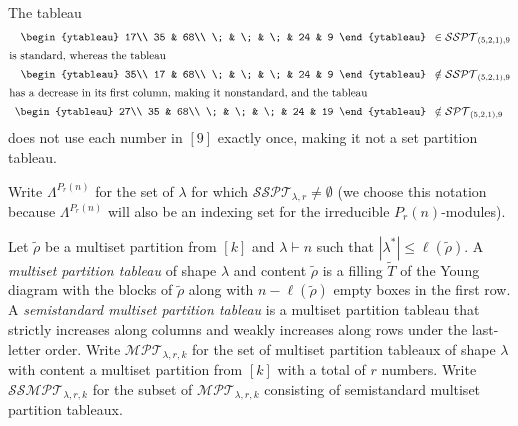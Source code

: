 \documentclass[ALCO,Unicode,published]{cedram}
\newcommand{\MPT}{\mathcal{MPT}}
\newcommand{\SPT}{\mathcal{SPT}}
\newcommand{\SSPT}{\mathcal{SSPT}}
\newcommand{\SSMPT}{\mathcal{SSMPT}}
\newcommand{\inline}[1]{\begin{array}{c}#1\end{array}}
\newcommand{\defn}[1]{\textcolor{defncolor}{\emph{#1}}}
\begin{document}
\begin{exam}The tableau
    \begin{align*}
\inline{\begin{ytableau}
        17\\
        35 & 68\\
        \; & \; & \; & 24 & 9
\end{ytableau}}&\in\SSPT_{(5,2,1),9}\\
        \intertext{is standard, whereas the tableau}
        \inline{\begin{ytableau}
        35\\
        17 & 68\\
        \; & \; & \; & 24 & 9
\end{ytableau}}&\notin\SSPT_{(5,2,1),9}\\
        \intertext{has a decrease in its first column, making it nonstandard, and the tableau}
        \inline{\begin{ytableau}
        27\\
        35 & 68\\
        \; & \; & \; & 24 & 19
\end{ytableau}}&\notin\SPT_{(5,2,1),9}\\
    \end{align*} does not use each number in $[9]$ exactly once, making it not a set partition tableau.
\end{exam}

Write $\Lambda^{P_r(n)}$ for the set of $\lambda$ for which $\SSPT_{\lambda,r}\neq\emptyset$ (we choose this notation because $\Lambda^{P_r(n)}$ will also be an indexing set for the irreducible $P_r(n)$-modules).

Let $\tilde\rho$ be a multiset partition from $[k]$ and $\lambda\vdash n$ such that $|\lambda^*|\leq\ell(\tilde\rho)$. A \defn{multiset partition tableau} of shape $\lambda$ and content $\tilde\rho$ is a filling $\tilde{T}$ of the Young diagram with the blocks of $\tilde\rho$ along with $n-\ell(\tilde\rho)$ empty boxes in the first row. A \defn{semistandard multiset partition tableau} is a multiset partition tableau that strictly increases along columns and weakly increases along rows under the last-letter order. Write $\MPT_{\lambda,r,k}$ for the set of multiset partition tableaux of shape $\lambda$ with content a multiset partition from $[k]$ with a total of $r$ numbers. Write $\SSMPT_{\lambda,r,k}$ for the subset of $\MPT_{\lambda,r,k}$ consisting of semistandard multiset partition tableaux.
\end{document}
